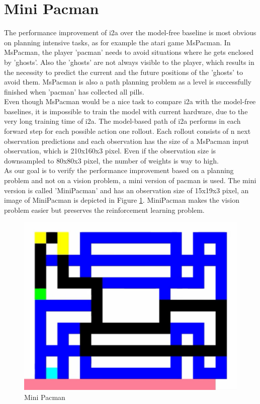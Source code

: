 \section{Mini Pacman}

The performance improvement of i2a over the model-free baseline is most obvious on planning intensive tasks, as for example the atari game MsPacman.
In MsPacman, the player 'pacman' needs to avoid situations where he gets enclosed by 'ghosts'. Also the 'ghosts' are not always visible to the player, which results in the necessity to predict the current and the future positions of the 'ghosts' to avoid them.
MsPacman is also a path planning problem as a level is successfully finished when 'pacman' has collected all pills.\\

Even though MsPacman would be a nice task to compare i2a with the model-free baselines, it is impossible to train the model with current hardware, due to the very long training time of i2a.
The model-based path of i2a performs in each forward step for each possible action one rollout.
Each rollout consists of n next observation predictions and each observation has the size of a MsPacman input observation, which is 210x160x3 pixel. Even if the observation size is downsampled to 80x80x3 pixel, the number of weights is way to high.\\

As our goal is to verify the performance improvement based on a planning problem and not on a vision problem, a mini version of pacman is used. The mini version is called 'MiniPacman' and has an observation size of 15x19x3 pixel, an image of MiniPacman is depicted in Figure \ref{fig:mini_pacman}.
MiniPacman makes the vision problem easier but preserves the reinforcement learning problem.


\begin{figure}[H] 
  \centering   
  \includegraphics[width=0.5\columnwidth]{./Images/mini_pacman.png}
  \caption{Mini Pacman} 
  \label{fig:mini_pacman} 
\end{figure} 


